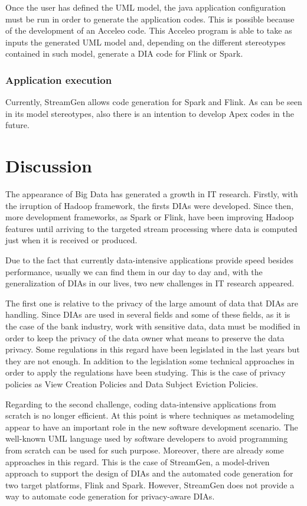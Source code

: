 Once the user has defined the UML model, the java application configuration must be run in order to generate the application codes. This is possible because of the development of an Acceleo code. This Acceleo program is able to take as inputs the generated UML model and, depending on the different stereotypes contained in such model, generate a DIA code for Flink or Spark.

\subsubsection*{Application execution}

Currently, StreamGen allows code generation for Spark and Flink. As can be seen in its model stereotypes, also there is an intention to develop Apex codes in the future.

\section{Discussion}

The appearance of Big Data has generated a growth in IT research. Firstly, with the irruption of Hadoop framework, the firsts DIAs were developed. Since then, more development frameworks, as Spark or Flink, have been improving Hadoop features until arriving to the targeted stream processing where data is computed just when it is received or produced.

Due to the fact that currently data-intensive applications provide speed besides performance, usually we can find them in our day to day and, with the generalization of DIAs in our lives, two new challenges in IT research appeared.

The first one is relative to the privacy of the large amount of data that DIAs are handling. Since DIAs are used in several fields and some of these fields, as it is the case of the bank industry, work with sensitive data, data must be modified in order to keep the privacy of the data owner what means to preserve the data privacy. Some regulations in this regard have been legislated in the last years but they are not enough. In addition to the legislation some technical approaches in order to apply the regulations have been studying. This is the case of privacy policies as View Creation Policies and Data Subject Eviction Policies.

Regarding to the second challenge, coding data-intensive applications from scratch is no longer efficient. At this point is where techniques as metamodeling appear to have an important role in the new software development scenario. The well-known UML language used by software developers to avoid programming from scratch can be used for such purpose. Moreover, there are already some approaches in this regard. This is the case of StreamGen, a model-driven approach to support the design of DIAs and the automated code generation for two target platforms, Flink and Spark. However, StreamGen does not provide a way to automate code generation for privacy-aware DIAs.












